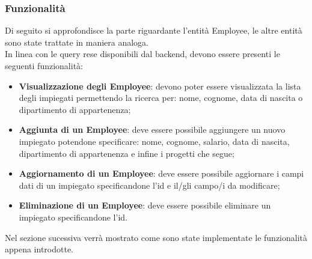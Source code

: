 \subsubsection*{Funzionalità}
Di seguito si approfondisce la parte riguardante l'entità Employee, le altre entità sono state trattate in maniera analoga.\\
In linea con le query rese disponibili dal backend, devono essere presenti le seguenti funzionalità:
\begin{itemize}
  \item \textbf{Visualizzazione degli Employee}: devono poter essere visualizzata la lista degli impiegati permettendo la ricerca per: nome, cognome, data di nascita o dipartimento di appartenenza;
  \item \textbf{Aggiunta di un Employee}: deve essere possibile aggiungere un nuovo impiegato potendone specificare: nome, cognome, salario, data di nascita, dipartimento di appartenenza e infine i progetti che segue;
  \item \textbf{Aggiornamento di un Employee}: deve essere possibile aggiornare i campi dati di un impiegato specificandone l'id e il/gli campo/i da modificare;
  \item \textbf{Eliminazione di un Employee}: deve essere possibile eliminare un impiegato specificandone l'id.
\end{itemize}
Nel sezione sucessiva verrà mostrato come sono state implementate le funzionalità appena introdotte.
